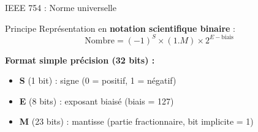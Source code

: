 \documentclass[aspectratio=1610]{beamer}
\begin{document}
\begin{frame}{IEEE 754 : Norme universelle}

  \begin{block}{Principe}
    Représentation en \textbf{notation scientifique binaire} :
    \[
      \text{Nombre} = (-1)^S \times (1.M) \times 2^{E - \text{biais}}
    \]
  \end{block}

  \vspace{0.3cm}

  \textbf{Format simple précision (32 bits) :}

  \begin{center}
  \end{center}


  \begin{itemize}
    \item \textbf{S} (1 bit) : signe (0 = positif, 1 = négatif)
    \item \textbf{E} (8 bits) : exposant biaisé (biais = 127)
    \item \textbf{M} (23 bits) : mantisse (partie fractionnaire, bit implicite = 1)
  \end{itemize}



\end{frame}
%
\end{document}
